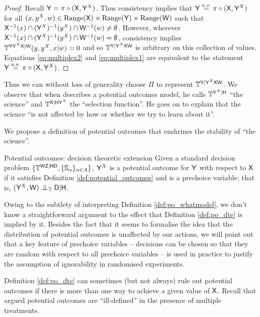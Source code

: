 \begin{proof}
Recall $\mathsf{Y} = \pi\circ(\mathsf{X},\mathsf{Y}^X)$. Thus consistency implies that $\mathsf{Y} \overset{a.s.}{=} \pi\circ(\mathsf{X},\mathsf{Y}^X)$ for all $(x, y^X,w)\in \text{Range}(\mathsf{X})\times \text{Range}(\mathsf{Y})\times \text{Range}(\mathsf{W})$ such that $\mathsf{X}^{-1}(x)\cap (\mathsf{Y}^X)^{-1}(y^X)\cap \mathsf{W}^{-1}(w)\neq \emptyset$. However, wherever $\mathsf{X}^{-1}(x)\cap (\mathsf{Y}^X)^{-1}(y^X)\cap \mathsf{W}^{-1}(w)= \emptyset$, consistency implies $\mathbb{T}^{\mathsf{Y}\mathsf{Y}^X\mathsf{X}|\mathsf{W}}(y,y^X,x|w)=0$ and so $\mathbb{T}^{\mathsf{Y}|\mathsf{Y}^X\mathsf{X}\mathsf{W}}$ is arbitrary on this collection of values. Equations \ref{eq:multiplex2} and \ref{eq:multiplex1} are equivalent to the statement $\mathsf{Y} \overset{a.s.}{=} \pi\circ(\mathsf{X},\mathsf{Y}^X)$.
\end{proof}

Thus we can without loss of generality choose $\Pi$ to represent $\mathbb{T}^{\mathsf{Y}|\mathsf{Y}^X\mathsf{X}\mathsf{W}}$. We observe that when \citet{rubin_causal_2005} describes a potential outcomes model, he calls $\mathbb{T}^{\mathsf{Y}^X|\mathsf{H}}$ ``the science'' and $\mathbb{T}^{\mathsf{X}|\mathsf{H}\mathsf{Y}^X}$ the ``selection function''. He goes on to explain that the science ``is not affected by how or whether we try to learn about it''.

We propose a definition of potential outcomes that enshrines the stability of ``the science''.

\begin{definition}{Potential outcomes: decision theoretic extension}\label{def:po_dte}
Given a standard decision problem $\{\mathbb{T}^{\mathsf{WZ}|\mathsf{HD}},\{\mathbb{S}_\alpha\}_{\alpha\in A}\}$, $\mathsf{Y}^X$ is a potential outcome for $\mathsf{Y}$ with respect to $\mathsf{X}$ if it satisfies Definition \ref{def:potential_outcomes} and is a prechoice variable; that is, $(\RV{Y}^X,\RV{W})\CI_{\model{T}} \RV{D}|\RV{H}$.
\end{definition}

Owing to the subtlety of interpreting Definition \ref{def:po_whatmodel}, we don't know a straightforward argument to the effect that Definition \ref{def:po_dte} is implied by it. Besides the fact that it seems to formalise the idea that the distribution of potential outcomes is unaffected by our actions, we will point out that a key feature of prechoice variables -- decisions can be chosen so that they are random with respect to all prechoice variables -- is used in practice to justify the assumption of ignorability in randomised experiments.

Definition \ref{def:po_dte} can sometimes (but not always) rule out potential outcomes if there is more than one way to achieve a given value of $\mathsf{X}$. Recall that \citet{hernan_does_2008} argued potential outcomes are ``ill-defined'' in the presence of multiple treatments.

